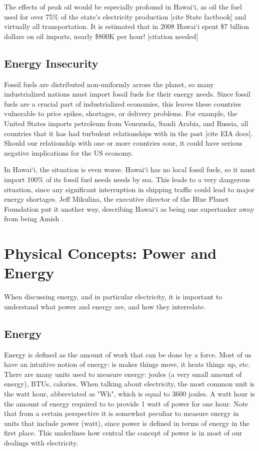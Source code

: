 The effects of peak oil would be especially profound in Hawai`i, as oil the fuel used for over 75\% of the state's electricity production [cite State factbook] and virtually all transportation. It is estimated that in 2008 Hawai`i spent \$7 billion dollars on oil imports, nearly \$800K per hour! [citation needed]

\subsection{Energy Insecurity}

Fossil fuels are distributed non-uniformly across the planet, so many industrialized nations must import fossil fuels for their energy needs. Since fossil fuels are a crucial part of industrialized economies, this leaves these countries vulnerable to price spikes, shortages, or delivery problems. For example, the United States imports petroleum from Venezuela, Saudi Arabia, and Russia, all countries that it has had turbulent relationships with in the past [cite EIA docs]. Should our relationship with one or more countries sour, it could have serious negative implications for the US economy.

In Hawai`i, the situation is even worse. Hawai`i has no local fossil fuels, so it must import 100\% of its fossil fuel needs needs by sea. This leads to a very dangerous situation, since any significant interruption in shipping traffic could lead to major energy shortages. Jeff Mikulina, the executive director of the Blue Planet Foundation put it another way, describing Hawai`i as being one supertanker away from being Amish \cite{nyt2008HawaiiMoonShot}.

\section{Physical Concepts: Power and Energy}

When discussing energy, and in particular electricity, it is important to understand what power and energy are, and how they interrelate.

\subsection{Energy}

Energy is defined as the amount of work that can be done by a force. Most of us have an intuitive notion of energy: is makes things move, it heats things up, etc. There are many units used to measure energy: joules (a very small amount of energy), BTUs, calories. When talking about electricity, the most common unit is the watt hour, abbreviated as "Wh", which is equal to 3600 joules. A watt hour is the amount of energy required to to provide 1 watt of power for one hour. Note that from a certain perspective it is somewhat peculiar to measure energy in units that include power (watt), since power is defined in terms of energy in the first place. This underlines how central the concept of power is in most of our dealings with electricity.

